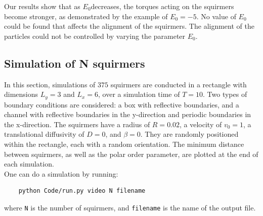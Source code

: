 \documentclass{article}
\begin{document}
Our results show that as $E_0$decreases, the torques acting on the squirmers become stronger, as 
demonstrated by the example of $E_0 = -5$. 
No value of $E_0$
could be found that affects the alignment of the squirmers. The alignment of the particles 
could not be controlled by varying the parameter $E_0$.

\subsection{Simulation of N squirmers}
In this section, simulations of $375$ squirmers are conducted in a rectangle with dimensions $L_y = 3$ and $L_x=6$, over 
a simulation time of $T=10$.  Two types of boundary conditions are considered: a box with reflective boundaries, 
and a channel with reflective boundaries in the y-direction and periodic boundaries in the x-direction.
The squirmers have a radius of $R = 0.02$, a velocity of $v_0 = 1$, a translational diffusivity of $D=0$, and $\beta = 0$.
 They are randomly positioned within the rectangle, each with a random orientation. The minimum distance between 
 squirmers, as well as the polar order parameter, are plotted at the end of each simulation.\\
One can do a simulation by running:
\begin{verbatim}
    python Code/run.py video N filename
\end{verbatim} 
where \texttt{N} is the number of squirmers, and \texttt{filename} is the name of the output file.
\end{document}
